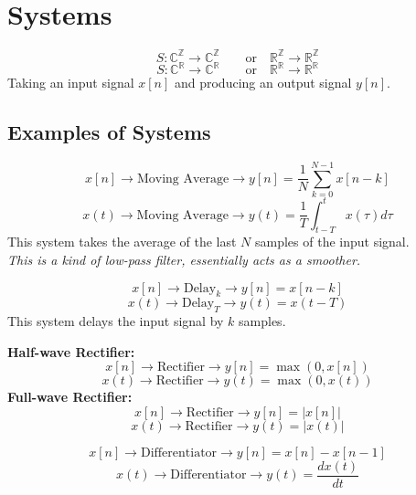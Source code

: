 \chapter{Systems}

\begin{definition}
    [System]
    $$S: \mathbb{C}^\mathbb{Z} \to \mathbb{C}^\mathbb{Z} \qquad \text{or} \quad \mathbb{R}^\mathbb{Z} \to \mathbb{R}^\mathbb{Z}$$
    $$S: \mathbb{C}^\mathbb{R} \to \mathbb{C}^\mathbb{R} \qquad \text{or} \quad \mathbb{R}^\mathbb{R} \to \mathbb{R}^\mathbb{R}$$
    Taking an input signal $x[n]$ and producing an output signal $y[n]$.
\end{definition}

\section{Examples of Systems}

\begin{definition}
    $$x[n] \to \boxed{\text{Moving Average}} \to y[n] = \frac{1}{N} \sum_{k=0}^{N-1} x[n-k]$$
    $$x(t) \to \boxed{\text{Moving Average}} \to y(t) = \frac{1}{T} \int_{t-T}^{t} x(\tau) d\tau$$
    This system takes the average of the last $N$ samples of the input signal. \\
    \textit{This is a kind of low-pass filter, essentially acts as a smoother.}
\end{definition}


\begin{definition}
    $$x[n] \to \boxed{\text{Delay}_k} \to y[n] = x[n-k]$$
    $$x(t) \to \boxed{\text{Delay}_T} \to y(t) = x(t-T)$$
    This system delays the input signal by $k$ samples.
\end{definition}

\begin{definition}
    \textbf{Half-wave Rectifier:}
    $$x[n] \to \boxed{\text{Rectifier}} \to y[n] = \max(0, x[n])$$
    $$x(t) \to \boxed{\text{Rectifier}} \to y(t) = \max(0, x(t))$$
    \textbf{Full-wave Rectifier:}
    $$x[n] \to \boxed{\text{Rectifier}} \to y[n] = |x[n]|$$
    $$x(t) \to \boxed{\text{Rectifier}} \to y(t) = |x(t)|$$
\end{definition}

\begin{definition}
    $$x[n] \to \boxed{\text{Differentiator}} \to y[n] = x[n] - x[n-1]$$
    $$x(t) \to \boxed{\text{Differentiator}} \to y(t) = \frac{dx(t)}{dt}$$

\end{definition}

